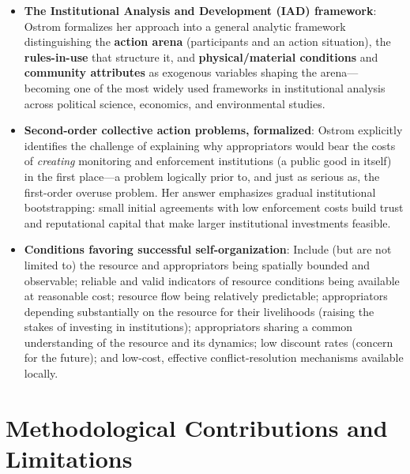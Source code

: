 \documentclass[12pt]{article}
\begin{document}
\begin{itemize}[leftmargin=*, itemsep=4pt]
    \item \textbf{The Institutional Analysis and Development (IAD) framework}: Ostrom formalizes her approach into a general analytic framework distinguishing the \textbf{action arena} (participants and an action situation), the \textbf{rules-in-use} that structure it, and \textbf{physical/material conditions} and \textbf{community attributes} as exogenous variables shaping the arena---becoming one of the most widely used frameworks in institutional analysis across political science, economics, and environmental studies.
    \item \textbf{Second-order collective action problems, formalized}: Ostrom explicitly identifies the challenge of explaining why appropriators would bear the costs of \emph{creating} monitoring and enforcement institutions (a public good in itself) in the first place---a problem logically prior to, and just as serious as, the first-order overuse problem. Her answer emphasizes gradual institutional bootstrapping: small initial agreements with low enforcement costs build trust and reputational capital that make larger institutional investments feasible.
    \item \textbf{Conditions favoring successful self-organization}: Include (but are not limited to) the resource and appropriators being spatially bounded and observable; reliable and valid indicators of resource conditions being available at reasonable cost; resource flow being relatively predictable; appropriators depending substantially on the resource for their livelihoods (raising the stakes of investing in institutions); appropriators sharing a common understanding of the resource and its dynamics; low discount rates (concern for the future); and low-cost, effective conflict-resolution mechanisms available locally.
\end{itemize}

\section{Methodological Contributions and Limitations}
\end{document}
